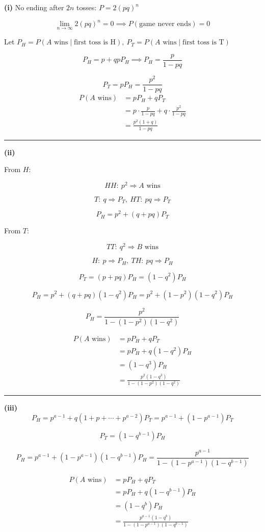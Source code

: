 \documentclass[12pt]{article}
\begin{document}
\newcommand{\ds}{\displaystyle}

\textbf{(i)} No ending after $2n$ tosses: $\ds P=2(pq)^n$

$$\lim_{n\to\infty}2(pq)^n=0\implies P(\text{game never ends})=0$$

Let $P_H=P(A\text{ wins}\mid \text{first toss is H}),\  P_T=P(A\text{ wins}\mid \text{first toss is T})$

$$P_H=p+qpP_H\implies P_H=\frac{p}{1-pq}$$

$$P_T=pP_H=\frac{p^2}{1-pq}$$
\begin{align*}
P(A\text{ wins})
&=pP_H+qP_T\\
&=p\cdot\frac{p}{1-pq}+q\cdot\frac{p^2}{1-pq}\\
&=\frac{p^2(1+q)}{1-pq}
\end{align*}

\bigskip\hrule\bigskip

\textbf{(ii)}

From $H$:

$$HH:\ p^2\Rightarrow A\text{ wins}$$

$$T:\ q\Rightarrow P_T,\  HT:\ pq\Rightarrow P_T$$

$$P_H=p^2+(q+pq)P_T$$

From $T$:

$$TT:\ q^2\Rightarrow B\text{ wins}$$

$$H:\ p\Rightarrow P_H,\  TH:\ pq\Rightarrow P_H$$

$$P_T=(p+pq)P_H=(1-q^2)P_H$$

$$P_H=p^2+(q+pq)(1-q^2)P_H=p^2+(1-p^2)(1-q^2)P_H$$

$$P_H=\frac{p^2}{1-(1-p^2)(1-q^2)}$$

\begin{align*}
P(A\text{ wins})
&=pP_H+qP_T\\
&=pP_H+q(1-q^2)P_H\\
&=(1-q^3)P_H\\
&=\frac{p^2(1-q^3)}{1-(1-p^2)(1-q^2)}
\end{align*}

\bigskip\hrule\bigskip

\textbf{(iii)}
$$P_H=p^{a-1}+q(1+p+\cdots+p^{a-2})P_T=p^{a-1}+(1-p^{a-1})P_T$$

$$P_T=(1-q^{b-1})P_H$$

$$P_H=p^{a-1}+(1-p^{a-1})(1-q^{b-1})P_H=\frac{p^{a-1}}{1-(1-p^{a-1})(1-q^{b-1})}$$


\begin{align*}
P(A\text{ wins})
&=pP_H+qP_T\\
&=pP_H+q(1-q^{b-1})P_H\\
&=(1-q^b)P_H\\
&=\frac{p^{a-1}(1-q^b)}{1-(1-p^{a-1})(1-q^{b-1})}
\end{align*}
\end{document}
